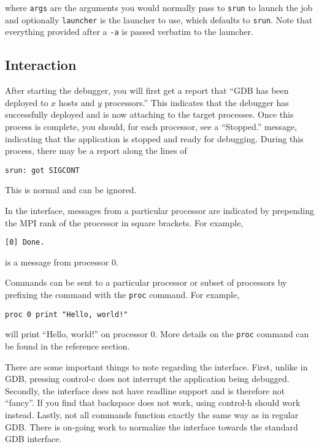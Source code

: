 \documentclass{refart}
\begin{document}
where \texttt{args} are the arguments you would normally pass to \texttt{srun} to launch the job and optionally \texttt{launcher} is the launcher to use, which defaults to \texttt{srun}. Note that everything provided after a \texttt{-a} is passed verbatim to the launcher.

\subsection{Interaction}

After starting the debugger, you will first get a report that ``GDB has been deployed to $x$ hosts and $y$ processors.'' This indicates that the debugger has successfully deployed and is now attaching to the target processes. Once this process is complete, you should, for each processor, see a ``Stopped.'' message, indicating that the application is stopped and ready for debugging. During this process, there may be a report along the lines of

\begin{Verbatim}
srun: got SIGCONT
\end{Verbatim}

This is normal and can be ignored.

In the interface, messages from a particular processor are indicated by prepending the MPI rank of the processor in square brackets. For example,

\begin{Verbatim}
[0] Done.
\end{Verbatim}

is a message from processor 0.

Commands can be sent to a particular processor or subset of processors by prefixing the command with the \texttt{proc} command. For example,

\begin{Verbatim}
proc 0 print "Hello, world!"
\end{Verbatim}

will print ``Hello, world!'' on processor 0. More details on the \texttt{proc} command can be found in the reference section.

There are some important things to note regarding the interface. First, unlike in GDB, pressing control-c does not interrupt the application being debugged. Secondly, the interface does not have readline support and is therefore not ``fancy''. If you find that backspace does not work, using control-h should work instead. Lastly, not all commands function exactly the same way as in regular GDB. There is on-going work to normalize the interface towards the standard GDB interface.
\end{document}
